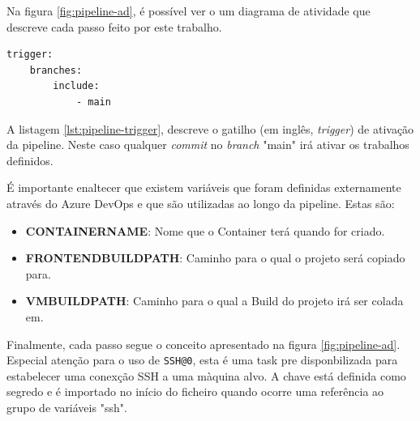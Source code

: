 Na figura \ref{fig:pipeline-ad}, é possível ver o um diagrama de atividade que descreve cada passo feito por este trabalho.

\begin{lstlisting}[caption={Trigger - Pipeline},label={lst:pipeline-trigger}]
trigger:
    branches:
        include:
            - main
\end{lstlisting}


A listagem \ref{lst:pipeline-trigger}, descreve o gatilho (em inglês, \textit{trigger}) de ativação da pipeline. Neste caso qualquer \textit{commit} no \textit{branch} "main" irá ativar os trabalhos definidos.

É importante enaltecer que existem variáveis que foram definidas externamente através do Azure DevOps e que são utilizadas ao longo da pipeline. Estas são:

\begin{itemize}
    \item \textbf{CONTAINERNAME}: Nome que o \gls{Container} terá quando for criado.
    \item \textbf{FRONTENDBUILDPATH}: Caminho para o qual o projeto será copiado para.
    \item \textbf{VMBUILDPATH}: Caminho para o qual a \gls{Build} do projeto irá ser colada em.
\end{itemize}

Finalmente, cada passo segue o conceito apresentado na figura \ref{fig:pipeline-ad}. Especial atenção para o uso de \lstinline|SSH@0|\cite{docs-SSH0}, esta é uma task pre disponbilizada para estabelecer uma conexção SSH a uma màquina alvo. A chave está definida como segredo e é importado no início do ficheiro quando ocorre uma referência ao grupo de variáveis "ssh".
